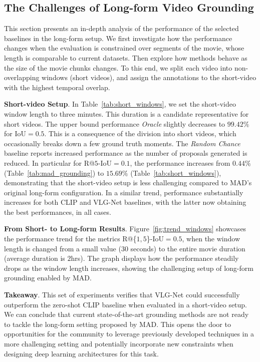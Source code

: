 \documentclass[10pt,twocolumn,letterpaper]{article}
\renewcommand{\paragraph}[1]{\vspace{1mm}\noindent\textbf{#1}.}
\begin{document}
\subsection{The Challenges of Long-form Video Grounding}
This section presents an in-depth analysis of the performance of the selected baselines in the long-form setup. We first investigate how the performance changes when the evaluation is constrained over segments of the movie, whose length is comparable to current datasets. Then explore how methods behave as the size of the movie chunks changes. To this end, we split each video into non-overlapping windows (short videos), and assign the annotations to the short-video with the highest temporal overlap. 

\paragraph{Short-video Setup}
In Table~\ref{tab:short_windows}, we set the short-video window length to three minutes. This duration is a candidate representative for short videos.
The upper bound performance \textit{Oracle} slightly decreases to $99.42\%$ for IoU${=}0.5$. This is a consequence of the division into short videos, which occasionally breaks down a few ground truth moments. The \textit{Random Chance} baseline reports increased performance as the number of proposals generated is reduced. In particular for R@$5$-IoU${=}0.1$, the performance increases from $0.44\%$ (Table~\ref{tab:mad_grounding}) to $15.69\%$ (Table~\ref{tab:short_windows}), demonstrating that the short-video setup is less challenging compared to MAD's original long-form configuration. In a similar trend, performance substantially increases for both CLIP and VLG-Net baselines, with the latter now obtaining the best performances, in all cases.

\paragraph{From Short- to Long-form Results}
Figure~\ref{fig:trend_windows} showcases the performance trend for the metrics R@\{$1,5$\}-IoU${=}0.5$, when  the window length is changed from a small value ($30$ seconds) to the entire movie duration (average duration is $2$hrs). The graph displays how the performance steadily drops as the window length increases, showing the challenging setup of long-form grounding enabled by MAD. 

\paragraph{Takeaway}
This set of experiments verifies that VLG-Net could successfully outperform the zero-shot CLIP baseline  when evaluated in a short-video setup.  We can conclude that current state-of-the-art grounding methods are not ready to tackle the long-form setting proposed by MAD. This opens the door to opportunities for the community to leverage previously developed techniques in a more challenging setting and potentially incorporate new constraints when designing deep learning architectures for this task. 
\end{document}
